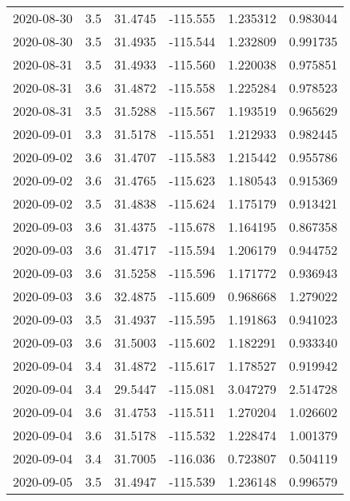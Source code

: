 \begin{tabular}{lrrrrr}
2020-08-30 &       3.5 &  31.4745 &  -115.555 &         1.235312 &         0.983044 \\
2020-08-30 &       3.5 &  31.4935 &  -115.544 &         1.232809 &         0.991735 \\
2020-08-31 &       3.5 &  31.4933 &  -115.560 &         1.220038 &         0.975851 \\
2020-08-31 &       3.6 &  31.4872 &  -115.558 &         1.225284 &         0.978523 \\
2020-08-31 &       3.5 &  31.5288 &  -115.567 &         1.193519 &         0.965629 \\
2020-09-01 &       3.3 &  31.5178 &  -115.551 &         1.212933 &         0.982445 \\
2020-09-02 &       3.6 &  31.4707 &  -115.583 &         1.215442 &         0.955786 \\
2020-09-02 &       3.6 &  31.4765 &  -115.623 &         1.180543 &         0.915369 \\
2020-09-02 &       3.5 &  31.4838 &  -115.624 &         1.175179 &         0.913421 \\
2020-09-03 &       3.6 &  31.4375 &  -115.678 &         1.164195 &         0.867358 \\
2020-09-03 &       3.6 &  31.4717 &  -115.594 &         1.206179 &         0.944752 \\
2020-09-03 &       3.6 &  31.5258 &  -115.596 &         1.171772 &         0.936943 \\
2020-09-03 &       3.6 &  32.4875 &  -115.609 &         0.968668 &         1.279022 \\
2020-09-03 &       3.5 &  31.4937 &  -115.595 &         1.191863 &         0.941023 \\
2020-09-03 &       3.6 &  31.5003 &  -115.602 &         1.182291 &         0.933340 \\
2020-09-04 &       3.4 &  31.4872 &  -115.617 &         1.178527 &         0.919942 \\
2020-09-04 &       3.4 &  29.5447 &  -115.081 &         3.047279 &         2.514728 \\
2020-09-04 &       3.6 &  31.4753 &  -115.511 &         1.270204 &         1.026602 \\
2020-09-04 &       3.6 &  31.5178 &  -115.532 &         1.228474 &         1.001379 \\
2020-09-04 &       3.4 &  31.7005 &  -116.036 &         0.723807 &         0.504119 \\
2020-09-05 &       3.5 &  31.4947 &  -115.539 &         1.236148 &         0.996579 \\

\end{tabular}
